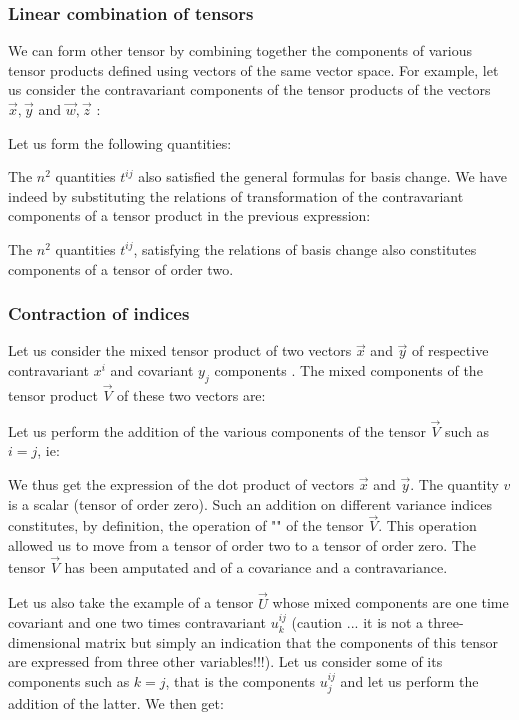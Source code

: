 	\subsubsection{Linear combination of tensors}
	We can form other tensor by combining together the components of various tensor products defined using vectors of the same vector space. For example, let us consider the contravariant components of the tensor products of the vectors $\vec{x},\vec{y}$ and $\vec{w},\vec{z}$ :
	
	Let us form the following quantities:
	
	The $n^2$ quantities $t^{ij}$ also satisfied the general formulas for basis change. We have indeed by substituting the relations of transformation of the  contravariant components of a tensor product in the previous expression:
	
	The $n^2$ quantities $t^{ij}$, satisfying the relations of basis change also constitutes components of a tensor of order two.

	\subsubsection{Contraction of indices}
	Let us consider the mixed tensor product of two vectors $\vec{x}$ and $\vec{y}$ of respective contravariant $x^i$ and covariant $y_j$ components . The mixed components of the tensor product $\vec{V}$ of these two vectors are:
	
	Let us perform the addition of the various components of the tensor $\vec{V}$ such as $i=j$, ie:
	
	We thus get the expression of the dot product of vectors $\vec{x}$ and $\vec{y}$. The quantity $v$ is a scalar (tensor of order zero). Such an addition on different variance indices constitutes, by definition, the operation of "" of the tensor $\vec{V}$. This operation allowed us to move from a tensor of order two to a tensor of order zero. The tensor $\vec{V}$ has been amputated and of a covariance and a contravariance.
	
	Let us also take the example of a tensor $\vec{U}$ whose mixed components are one time covariant and one two times contravariant $u_k^{ij}$ (caution ... it is not a three-dimensional matrix but simply an indication that the components of this tensor are expressed from three other variables!!!). Let us consider some of its components such as $k=j$, that is the components $u_j^{ij}$ and let us perform the addition of the latter. We then get:
	
